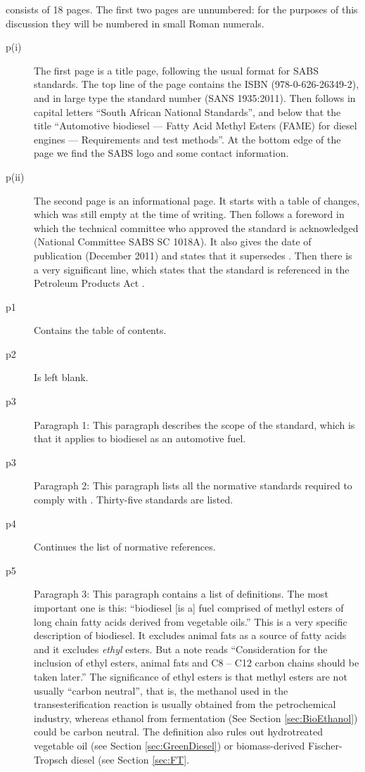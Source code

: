  consists of 18 pages. The first two pages are unnumbered: for
the purposes of this discussion they will be numbered in small Roman numerals.

\begin{description}


\item[p(i)]{The first page is a title page, following the usual format for SABS
standards. The top line of the page contains the ISBN (978-0-626-26349-2), and
in large type the standard number (SANS 1935:2011). Then follows in capital
letters ``South African National Standards'', and below that the title
``Automotive biodiesel --- Fatty Acid Methyl Esters (FAME) for diesel engines
--- Requirements and test methods''. At the bottom edge of the page we find the
SABS logo and some contact information.}

\item[p(ii)]{The second page is an informational page. It starts with a table of
changes, which was still empty at the time of writing. Then follows a foreword
in which the technical committee who approved the standard is acknowledged
(National Committee SABS SC 1018A). It also gives the date of publication
(December 2011) and states that it supersedes . Then there is a
very significant line, which states that the standard is referenced in the
Petroleum Products Act \autocite{Act120-1997}. }
	
\item[p1]{Contains the table of contents.} 

\item[p2]{Is left blank.}

\item[p3]{Paragraph 1: This paragraph describes the scope of the standard, which
is that it applies to biodiesel as an automotive fuel.} 

\item[p3]{Paragraph 2:
This paragraph lists all the normative standards required to comply with . Thirty-five standards are listed.}

\item[p4]{Continues the list of normative references.}

\item[p5]{Paragraph 3: This paragraph contains a list of definitions. The most
important one is this: ``biodiesel [is a] fuel comprised of methyl esters of
long chain fatty acids derived from vegetable oils.'' This is a very specific
description of biodiesel. It excludes animal fats as a source of fatty acids and
it excludes \textit{ethyl} esters. But a note reads ``Consideration for the
inclusion of ethyl esters, animal fats and C8 – C12 carbon chains should be
taken later.'' The significance of ethyl esters is that methyl esters are not
usually ``carbon neutral'', that is, the methanol used in the
transesterification reaction is usually obtained from the petrochemical
industry, whereas ethanol from fermentation (See Section \ref{sec:BioEthanol})
could be carbon neutral.
The definition also rules out hydrotreated vegetable oil (see Section
\ref{sec:GreenDiesel}) or biomass-derived Fischer-Tropsch diesel (see Section
\ref{sec:FT}.}


\end{description}
